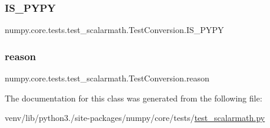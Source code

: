 \subsubsection{\texorpdfstring{I\+S\+\_\+\+P\+Y\+PY}{IS\_PYPY}}
{\footnotesize\ttfamily numpy.\+core.\+tests.\+test\+\_\+scalarmath.\+Test\+Conversion.\+I\+S\+\_\+\+P\+Y\+PY\hspace{0.3cm}{\ttfamily [static]}}

\mbox{\label{classnumpy_1_1core_1_1tests_1_1test__scalarmath_1_1TestConversion_ab83435aeddde56e2d14e80ea0b79a726}} 
\subsubsection{\texorpdfstring{reason}{reason}}
{\footnotesize\ttfamily numpy.\+core.\+tests.\+test\+\_\+scalarmath.\+Test\+Conversion.\+reason\hspace{0.3cm}{\ttfamily [static]}}



The documentation for this class was generated from the following file\+:\begin{DoxyCompactItemize}
\item 
venv/lib/python3./site-\/packages/numpy/core/tests/\hyperlink{test__scalarmath_8py}{test\+\_\+scalarmath.\+py}\end{DoxyCompactItemize}

